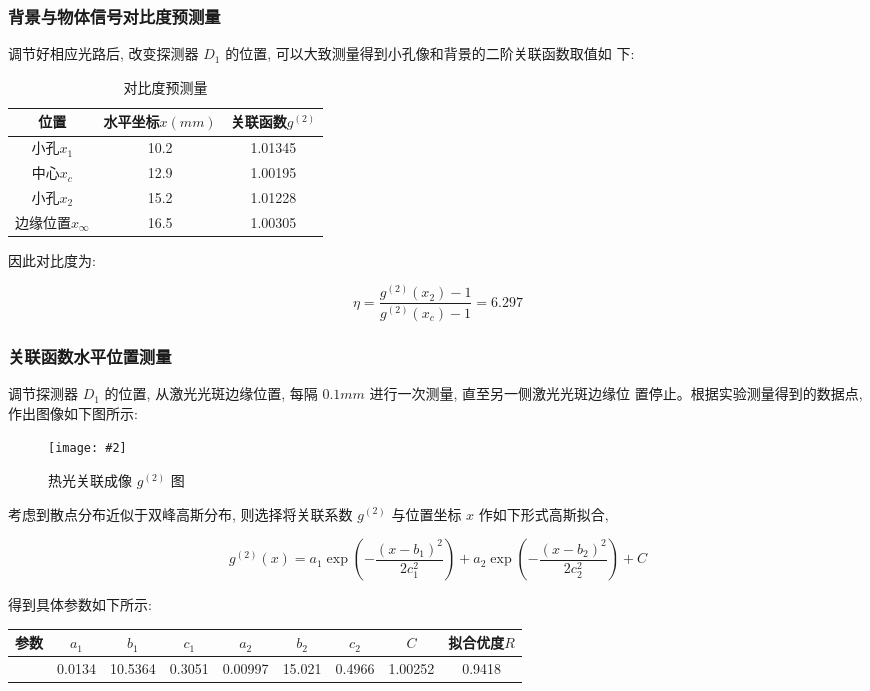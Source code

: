 \documentclass[12pt,a4paper]{article}
\newcommand{\be}[1]{
    \begin{equation}
        #1
    \end{equation}
}
\newcommand{\bfig}[3]{
    \begin{figure}[H]
        \centering
        \texttt{[image: \#2]}
        \caption{#3}
    \end{figure}
}
\begin{document}
\subsubsection{背景与物体信号对比度预测量}


调节好相应光路后, 改变探测器 $D_1$ 的位置, 可以大致测量得到小孔像和背景的二阶关联函数取值如
下:
\begin{table}[H]
    \centering
    \begin{tabular}{|c|c|c|}
    \hline
    位置     & 水平坐标$x(mm)$ & 关联函数$g^{(2)}$  \\ \hline
    小孔$x_1$   & 10.2  & 1.01345 \\ \hline
    中心$x_c$   & 12.9  & 1.00195 \\ \hline
    小孔$x_2$   & 15.2  & 1.01228 \\ \hline
    边缘位置$x_{\infty}$ & 16.5  & 1.00305 \\ \hline
    \end{tabular}
    \caption{对比度预测量}
    \end{table}


因此对比度为:
\be{\eta=\frac{g^{(2)}\left(x_{2}\right)-1}{g^{(2)}\left(x_{c}\right)-1}=6.297}

\subsubsection{关联函数水平位置测量}
调节探测器 $D_1$ 的位置, 从激光光斑边缘位置, 每隔 $0.1mm$ 进行一次测量, 直至另一侧激光光斑边缘位
置停止。根据实验测量得到的数据点, 作出图像如下图所示:
\bfig{0.8}{空间关联2.png}{ 热光关联成像 $g^{(2)}$ 图}
考虑到散点分布近似于双峰高斯分布, 则选择将关联系数 $g^{(2)}$ 与位置坐标 $x$ 作如下形式高斯拟合,
\be{g^{(2)}(x)=a_{1} \exp \left(-\frac{\left(x-b_{1}\right)^{2}}{2 c_{1}^{2}}\right)+a_{2} \exp \left(-\frac{\left(x-b_{2}\right)^{2}}{2 c_{2}^{2}}\right)+C}
得到具体参数如下所示:
\begin{table}[H]
    \centering
    \begin{tabular}{|c|c|c|c|c|c|c|c|c|}
    \hline
    参数 & $a_1$          & $b_1$          & $c_1$          & $a_2$          & $b_2$         & $c_2 $         &$ C$           & 拟合优度$R$  \\ \hline
       & 0.0134 & 10.5364 & 0.3051 & 0.00997 & 15.021 & 0.4966 & 1.00252 & 0.9418 \\ \hline
    \end{tabular}
    \end{table}
\end{document}
